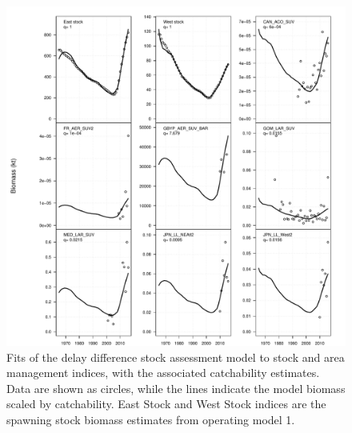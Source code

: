 \documentclass[]{article}
\begin{document}
\begin{figure}[htb]

{\centering \includegraphics[width=0.9\linewidth]{data/AM/1/indexFits} 

}

\caption{Fits of the delay difference stock assessment model to stock and area management indices, with the associated catchability estimates. Data are shown as circles, while the lines indicate the model biomass scaled by catchability. East Stock and West Stock indices are the spawning stock biomass estimates from operating model 1.}\label{fig:amIdxFitsPlot}
\end{figure}
\end{document}
